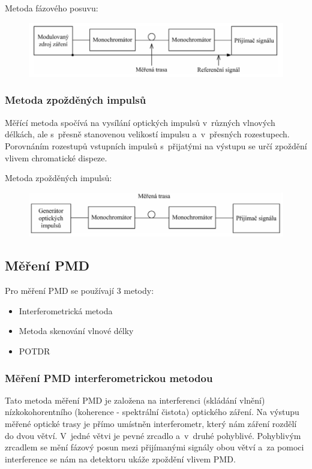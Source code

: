 Metoda fázového posuvu:
\begin{figure}[!ht]
  \begin{center}
    \includegraphics[scale=1]{obrazky/chrommer.png}
  \end{center}
\end{figure}

\subsubsection{Metoda zpožděných impulsů}
Měřící metoda spočívá na vysílání optických impulsů v~různých vlnových délkách, ale s~přesně stanovenou velikostí impulsu a~v~přesných rozestupech. Porovnáním rozestupů vstupních impulsů s~přijatými na výstupu se určí zpoždění vlivem chromatické dispeze.

Metoda zpožděných impulsů:
\begin{figure}[!ht]
  \begin{center}
    \includegraphics[scale=1]{obrazky/chrommer2.png}
  \end{center}
\end{figure}

\subsection{Měření PMD}
Pro měření PMD se používají 3 metody:
\begin{itemize}
  \item Interferometrická metoda
  \item Metoda skenování vlnové délky
  \item POTDR
\end{itemize}

\subsubsection{Měření PMD interferometrickou metodou}
Tato metoda měření PMD je založena na interferenci (skládání vlnění) nízkokohorentního (koherence - spektrální čistota) optického záření. Na výstupu měřené optické trasy je přímo umístněn interferometr, který nám záření rozdělí do dvou větví. V~jedné větvi je pevné zrcadlo a~v~druhé pohyblivé. Pohyblivým zrcadlem se mění fázový posun mezi přijímanými signály obou větví a~za pomoci interference se nám na detektoru ukáže zpoždění vlivem PMD.

